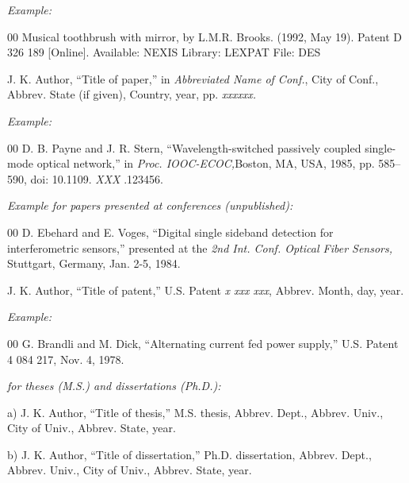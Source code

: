 \documentclass{ieeetj}
\begin{document}
{\it Example:}

\begin{thebibliography}{00}
 Musical toothbrush with mirror, by L.M.R. Brooks. (1992, May 19). Patent D 326 189 [Online]. Available: NEXIS Library: LEXPAT File: DES
\end{thebibliography}



\noindent J. K. Author, ``Title of paper,'' in {\it Abbreviated Name of Conf.}, City of Conf., Abbrev. State (if
given), Country, year, pp. {\it xxxxxx.}

{\it Example:}

\begin{thebibliography}{00}
 D. B. Payne and J. R. Stern, ``Wavelength-switched passively coupled single-mode optical network,'' in {\it Proc. IOOC-ECOC,}Boston, MA, USA,  1985,
pp. 585--590, doi:  {10.1109.} {{\it XXX}} {.123456}.
\end{thebibliography}

{\it Example for papers presented at conferences (unpublished):}

\begin{thebibliography}{00}
 D. Ebehard and E. Voges, ``Digital single sideband detection for interferometric sensors,'' presented at the {\it 2nd Int. Conf. Optical Fiber Sensors,} Stuttgart, Germany, Jan. 2-5, 1984.
\end{thebibliography}


\noindent J. K. Author, ``Title of patent,'' U.S. Patent {\it x xxx xxx}, Abbrev. Month, day, year.

{\it Example:}

\begin{thebibliography}{00}
 G. Brandli and M. Dick, ``Alternating current fed power supply,'' U.S. Patent 4 084 217, Nov. 4, 1978.
\end{thebibliography}

 {\it for theses (M.S.) and dissertations (Ph.D.):}

\noindent a) J. K. Author, ``Title of thesis,'' M.S. thesis, Abbrev. Dept., Abbrev.
Univ., City of Univ., Abbrev. State, year.

\noindent b) J. K. Author, ``Title of dissertation,'' Ph.D. dissertation, Abbrev.
Dept., Abbrev. Univ., City of Univ., Abbrev. State, year.
\end{document}
